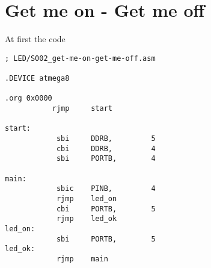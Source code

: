 \section{Get me on - Get me off}

At first the code


\begin{lstlisting}
; LED/S002_get-me-on-get-me-off.asm

.DEVICE atmega8

.org 0x0000
           rjmp     start

start:
            sbi     DDRB,         5
            cbi     DDRB,         4
            sbi     PORTB,        4

main:
            sbic    PINB,         4
            rjmp    led_on
            cbi     PORTB,        5
            rjmp    led_ok
led_on:
            sbi     PORTB,        5
led_ok:
            rjmp    main
\end{lstlisting}
